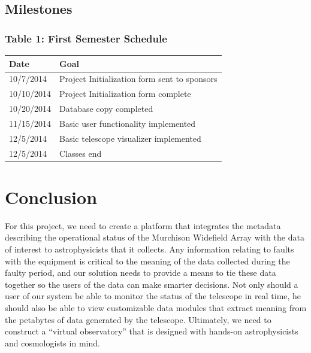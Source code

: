\documentclass[12pt]{article}
\begin{document}
\begin{spacing}{1.5}
\subsection{Milestones}
\subsubsection{Table 1: First Semester Schedule}
\begin{tabular}{l | l}
Date			&	Goal \\
\hline
10/7/2014		&	Project Initialization form sent to sponsors \\
\hline
10/10/2014		&	Project Initialization form complete \\
\hline
10/20/2014		&	Database copy completed \\
\hline
11/15/2014		&	Basic user functionality implemented \\
\hline
12/5/2014		&	Basic telescope visualizer implemented \\
\hline
12/5/2014		&	Classes end \\
\end{tabular}

\newpage

\section{Conclusion}
For this project, we need to create a platform that integrates the metadata describing the operational status of the Murchison Widefield Array with the data  of interest to astrophysicists that it collects. Any information relating to faults with the equipment is critical to the meaning of the data collected during the faulty period, and our solution needs to provide a means to tie these data together so the users of the data can make smarter decisions. Not only should a user of our system be able to monitor the status of the telescope in real time, he should also be able to view customizable data modules that extract meaning from the petabytes of data generated by the telescope. Ultimately, we need to construct a ``virtual observatory'' that is designed with hands-on astrophysicists and cosmologists in mind.

\end{spacing}
\end{document}
